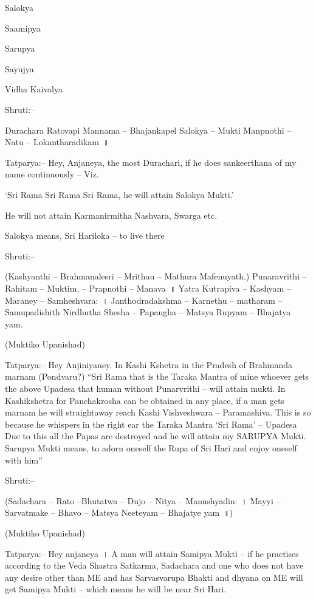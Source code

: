 \item Salokya

 \item Saamipya

 \item Sarupya

 \item Sayujya

 \item Vidha Kaivalya

Shruti:–

Durachara Ratovapi Mannama – Bhajankapel Salokya – Mukti Manpnothi – Natu – Lokantharadikam~॥

Tatparya:– Hey, Anjaneya, the most Durachari, if he does sankeerthana of my name continuously – Viz.

‘Sri Rama Sri Rama Sri Rama, he will attain Salokya Mukti.’

He will not attain Karmanirmitha Nashvara, Swarga etc.

Salokya means, Sri Hariloka – to live there

Shruti:–

(Kashyanthi – Brahmanalesri – Mrithau – Mathura Mafenuyath.) Punaravrithi – Rahitam – Muktim, – Prapnothi – Manava~॥ Yatra Kutrapiva – Kashyam – Maraney – Samheshvara:~। Janthodradakshma – Karnethu – matharam – Samupadishith Nirdhutha Shesha – Papaugha – Matsya Rupyam – Bhajatya yam.

(Muktiko Upanishad)

Tatparya:– Hey Anjiniyaney. In Kashi Kshetra in the Pradesh of Brahmanda marnam (Pondvaru?) “Sri Rama that is the Taraka Mantra of mine whoever gets the above Upadesa that human without Punarvrithi – will attain mukti. In Kashikshetra for Panchakrosha can be obtained in any place, if a man gets marnam he will straightaway reach Kashi Vishveshwara – Paramashiva. This is so because he whispers in the right ear the Taraka Mantra ‘Sri Rama’ – Upadesa Due to this all the Papas are destroyed and he will attain my SARUPYA Mukti. Sarupya Mukti means, to adorn oneself the Rupa of Sri Hari and enjoy oneself with him”

Shruti:–

 (Sadachara – Rato –Bhutatwa – Dujo – Nitya – Manushyadin:~। Mayyi – Sarvatmake – Bhavo – Matsya Neeteyam – Bhajatye yam~॥)

(Muktiko Upanishad)

Tatparya:– Hey anjaneya~। A man will attain Samipya Mukti – if he practises according to the Veda Shastra Satkarma, Sadachara and one who does not have any desire other than ME and has Sarvasvarupa Bhakti and dhyana on ME will get Samipya Mukti – which means he will be near Sri Hari.

